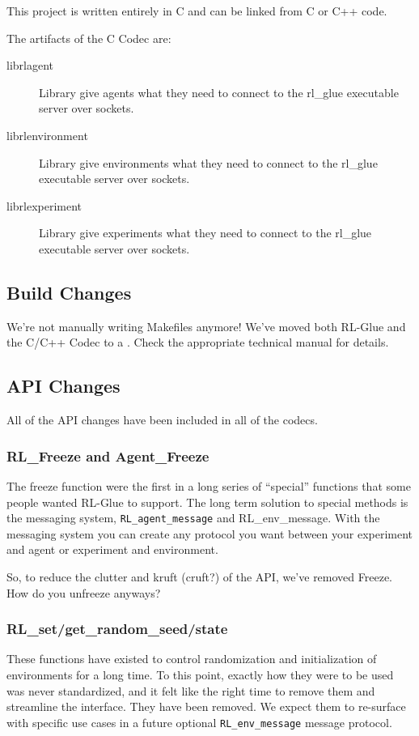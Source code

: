 \documentclass[11pt]{article}
\begin{document}
This project is written entirely in C and can be linked from C or C++ code.

The artifacts of the C Codec are:
\begin{description}
	\item [librlagent] Library give agents what they need to connect to the rl\_glue executable server over sockets.
	\item [librlenvironment] Library give environments what they need to connect to the rl\_glue executable server over sockets.
	\item [librlexperiment] Library give experiments what they need to connect to the rl\_glue executable server over sockets.
\end{description}

\subsection{Build Changes}
We're not manually writing Makefiles anymore!  We've moved both RL-Glue and the C/C++ Codec to a . Check the appropriate technical manual for details.

\subsection{API Changes}
All of the API changes have been included in all of the codecs.


\subsubsection{RL\_Freeze and Agent\_Freeze}
The freeze function were the first in a long series of ``special'' functions that some people wanted RL-Glue to support.  The long term solution to special methods is the messaging system, \texttt{RL\_agent\_message} and RL\_env\_message. With the messaging system you can create any protocol you want between your experiment and agent or experiment and environment.

So, to reduce the clutter and kruft (cruft?) of the API, we've removed Freeze.  How do you unfreeze anyways?

\subsubsection{RL\_set/get\_random\_seed/state}
These functions have existed to control randomization and initialization of environments for a long time.  To this point, exactly how they were to be used was never standardized, and it felt like the right time to remove them and streamline the interface.  They have been removed.  We expect them to re-surface with specific use cases in a future optional \texttt{RL\_env\_message} message protocol.
\end{document}
